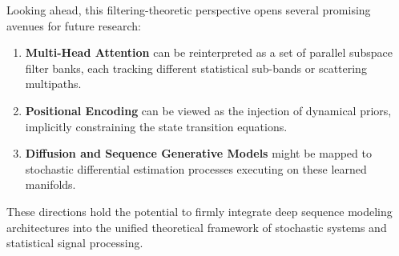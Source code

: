 \documentclass[conference]{IEEEtran}
\begin{document}
Looking ahead, this filtering-theoretic perspective opens several promising avenues for future research:
\begin{enumerate}
    \item \textbf{Multi-Head Attention} can be reinterpreted as a set of parallel subspace filter banks, each tracking different statistical sub-bands or scattering multipaths.
    \item \textbf{Positional Encoding} can be viewed as the injection of dynamical priors, implicitly constraining the state transition equations.
    \item \textbf{Diffusion and Sequence Generative Models} might be mapped to stochastic differential estimation processes executing on these learned manifolds.
\end{enumerate}
These directions hold the potential to firmly integrate deep sequence modeling architectures into the unified theoretical framework of stochastic systems and statistical signal processing.


\end{document}
